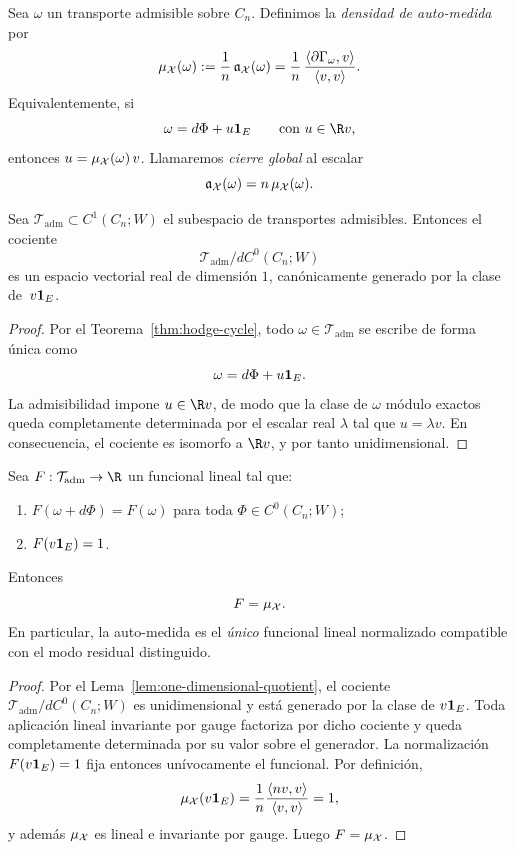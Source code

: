\begin{definition}
Sea $\omega$ un transporte admisible sobre $C_n$. Definimos la \emph{densidad de auto-medida}
por
\[
\mu_\mathcal X(\omega):=\frac{1}{n}\,\mathfrak a_\mathcal X(\omega)
=\frac{1}{n}\,\frac{\langle \partial\Gamma_\omega,v\rangle}{\langle v,v\rangle}.
\]
Equivalentemente, si
\[
\omega=d\Phi+u\oneE
\qquad\text{con }u\in\R v,
\]
entonces $u=\mu_\mathcal X(\omega)\,v$.
Llamaremos \emph{cierre global} al escalar
\[
\mathfrak a_\mathcal X(\omega)=n\,\mu_\mathcal X(\omega).
\]
\end{definition}

\begin{lemma}\label{lem:one-dimensional-quotient}
Sea $\mathcal T_{\mathrm{adm}}\subset C^1(C_n;W)$ el subespacio de transportes admisibles. Entonces
el cociente
\[
\mathcal T_{\mathrm{adm}}/dC^0(C_n;W)
\]
es un espacio vectorial real de dimensión $1$, canónicamente generado por la clase de
$\,v\mathbf 1_E$.
\end{lemma}

\begin{proof}
Por el Teorema~\ref{thm:hodge-cycle}, todo $\omega\in\mathcal T_{\mathrm{adm}}$ se escribe de forma
única como
\[
\omega=d\Phi+u\mathbf 1_E.
\]
La admisibilidad impone $u\in\R v$, de modo que la clase de $\omega$ módulo exactos queda
completamente determinada por el escalar real $\lambda$ tal que $u=\lambda v$. En consecuencia,
el cociente es isomorfo a $\R v$, y por tanto unidimensional.
\end{proof}

\begin{theorem}\label{thm:uniqueness-self-measurement}
Sea $F:\mathcal T_{\mathrm{adm}}\to\R$ un funcional lineal tal que:
\begin{enumerate}[label=\textup{(\roman*)}]
\item $F(\omega+d\Phi)=F(\omega)$ para toda $\Phi\in C^0(C_n;W)$;
\item $F(v\mathbf 1_E)=1$.
\end{enumerate}
Entonces
\[
F=\mu_\mathcal X.
\]
En particular, la auto-medida es el \emph{único} funcional lineal normalizado compatible con el modo
residual distinguido.
\end{theorem}

\begin{proof}
Por el Lema~\ref{lem:one-dimensional-quotient}, el cociente
$\mathcal T_{\mathrm{adm}}/dC^0(C_n;W)$ es unidimensional y está generado por la clase de
$v\mathbf 1_E$. Toda aplicación lineal invariante por gauge factoriza por dicho cociente y queda
completamente determinada por su valor sobre el generador. La normalización
$F(v\mathbf 1_E)=1$ fija entonces unívocamente el funcional. Por definición,
\[
\mu_\mathcal X(v\mathbf 1_E)=\frac1n\frac{\langle nv,v\rangle}{\langle v,v\rangle}=1,
\]
y además $\mu_\mathcal X$ es lineal e invariante por gauge. Luego $F=\mu_\mathcal X$.
\end{proof}

